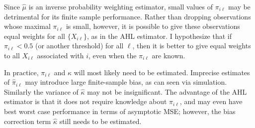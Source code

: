 \documentclass[11pt]{amsart}
\begin{document}
Since $\hat{\mu}$ is an inverse probability weighting estimator, small values of $\pi_{i\ell}$ may be detrimental for its finite sample performance.  Rather than dropping observations whose maximal $\pi_{i\ell}$ is small, however, it is possible to give these observations equal weights for all $\{X_{i\ell}\}$, as in the AHL estimator.  I hypothesize that if $\pi_{i\ell} < 0.5$ (or another threshold) for all $\ell$, then it is better to give equal weights to all $X_{i\ell}$ associated with $i$, even when the $\pi_{i\ell}$ are known.

In practice, $\pi_{i\ell}$ and $\kappa$ will most likely need to be estimated. Imprecise estimates of $\hat{\pi}_{i\ell}$ may introduce large finite-sample bias, as can seen via simulation.  Similarly the variance of $\hat{\kappa}$ may not be insignificant.   The advantage of the AHL estimator is that it does not require knowledge about $\pi_{i\ell}$, and may even have best worst case performance in terms of asymptotic MSE; however, the bias correction term $\hat{\kappa}$ still needs to be estimated. 
\end{document}
